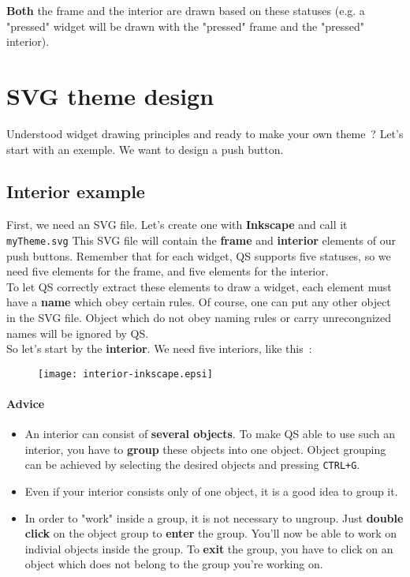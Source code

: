 \documentclass[a4paper,12pt]{report}
\begin{document}
\textbf{Both} the frame and the interior are drawn based on these statuses
(e.g. a "pressed" widget will be drawn with the "pressed" frame and the
"pressed" interior).

\section{SVG theme design}
Understood widget drawing principles and ready to make your own theme~? Let's
start with an exemple. We want to design a push button.

\subsection{Interior example}
First, we need an SVG file. Let's create one with \textbf{Inkscape} and call it
\verb,myTheme.svg, This SVG file will contain the \textbf{frame} and
\textbf{interior} elements of our push buttons. Remember that for each widget,
QS supports five statuses, so we need five elements for the frame, and five
elements for the interior.\\

To let QS correctly extract these elements to draw a widget, each element must
have a \textbf{name} which obey certain rules. Of course, one can put any other
object in the SVG file. Object which do not obey naming rules or carry
unrecongnized names will be ignored by QS.\\

So let's start by the \textbf{interior}. We need five interiors, like this~:

\begin{figure}[hbtp]
  \centering
  \texttt{[image: interior-inkscape.epsi]}
\end{figure}

\paragraph*{Advice}
\begin{itemize}
  \item An interior can consist of \textbf{several objects}. To make QS able to
use such an interior, you have to \textbf{group} these objects into one object.
Object grouping can be achieved by selecting the desired objects and pressing
\verb,CTRL+G,.\\
  \item Even if your interior consists only of one object, it is a good idea to
group it.\\
  \item In order to "work" inside a group, it is not necessary to ungroup. Just
\textbf{double click} on the object group to \textbf{enter} the group. You'll
now be able to work on indivial objects inside the group. To \textbf{exit} the
group, you have to click on an object which does not belong to the group you're
working on.\\
\end{itemize}
\end{document}
